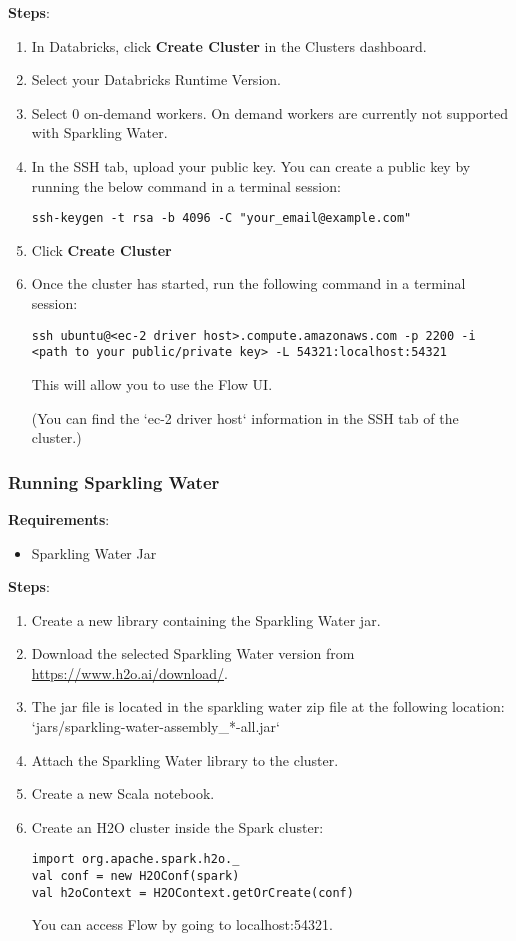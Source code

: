 \textbf{Steps}:
\begin{enumerate}
\item In Databricks, click \textbf{Create Cluster} in the Clusters dashboard.
\item Select your Databricks Runtime Version.
\item Select 0 on-demand workers. On demand workers are currently not supported with Sparkling Water.
\item In the SSH tab, upload your public key.  You can create a public key by running the below command in a terminal session:
\begin{lstlisting}[style=Bash]
ssh-keygen -t rsa -b 4096 -C "your_email@example.com"
\end{lstlisting}
\item Click \textbf{Create Cluster}
\item Once the cluster has started, run the following command in a terminal session:
\begin{lstlisting}[style=Bash]
ssh ubuntu@<ec-2 driver host>.compute.amazonaws.com -p 2200 -i <path to your public/private key> -L 54321:localhost:54321
\end{lstlisting}
This will allow you to use the Flow UI.

(You can find the `ec-2 driver host` information in the SSH tab of the cluster.)

\end{enumerate}

\subsubsection{Running Sparkling Water}

\textbf{Requirements}:
\begin{itemize}
\item Sparkling Water Jar
\end{itemize}

\textbf{Steps}:
\begin{enumerate}
\item Create a new library containing the Sparkling Water jar.
\item Download the selected Sparkling Water version from \url{https://www.h2o.ai/download/}.
\item The jar file is located in the sparkling water zip file at the following location: `jars/sparkling-water-assembly\_*-all.jar`
\item Attach the Sparkling Water library to the cluster.
\item Create a new Scala notebook.
\item Create an H2O cluster inside the Spark cluster:
\begin{lstlisting}[style=Scala]
import org.apache.spark.h2o._
val conf = new H2OConf(spark)
val h2oContext = H2OContext.getOrCreate(conf)
\end{lstlisting}
You can access Flow by going to localhost:54321.
\end{enumerate}

